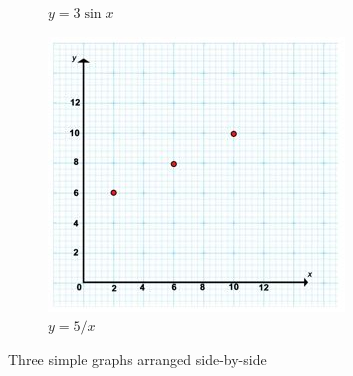\documentclass[10pt,a4paper]{article}
\begin{document}
\begin{figure}[h]
\begin{subfigure}[b]{0.3\textwidth}
 \caption{$y=3\sin x$}
 \label{fig:three sin x}
 \end{subfigure}
 \hfill
 \begin{subfigure}[b]{0.3\textwidth}
 \centering
 \includegraphics[width=\textwidth]{5divides.jpg}
 \caption{$y=5/x$}
 \label{fig:five over x}
 \end{subfigure}
 \caption{Three simple graphs arranged side-by-side}
 \label{fig:three graphs}
\end{figure}
\end{document}
